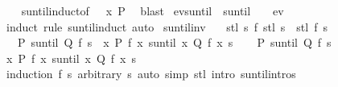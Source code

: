 \begin{isabellebody}
%
\isadelimproof
\ \ %
\endisadelimproof
%
\isatagproof
{}\isamarkupfalse%
\ suntil{\isachardot}induct{\isacharbrackleft}of\ {\isasymphi}\ {\isasympsi}\ x\ P{\isacharbrackright}\ \isamarkupfalse%
\ blast%
\endisatagproof
{\isafoldproof}%
%
\isadelimproof
\isanewline
%
\endisadelimproof
\isanewline
{}\isamarkupfalse%
\ ev{\isacharunderscore}suntil{\isacharcolon}\ {\isachardoublequoteopen}{\isacharparenleft}{\isasymphi}\ suntil\ {\isasympsi}{\isacharparenright}\ {\isasymomega}\ {\isasymLongrightarrow}\ ev\ {\isasympsi}\ {\isasymomega}{\isachardoublequoteclose}\isanewline
%
\isadelimproof
\ \ %
\endisadelimproof
%
\isatagproof
{}\isamarkupfalse%
\ {\isacharparenleft}induct\ rule{\isacharcolon}\ suntil{\isachardot}induct{\isacharparenright}\ auto%
\endisatagproof
{\isafoldproof}%
%
\isadelimproof
\isanewline
%
\endisadelimproof
\isanewline
{}\isamarkupfalse%
\ suntil{\isacharunderscore}inv{\isacharcolon}\isanewline
\ \ \ stl{\isacharcolon}\ {\isachardoublequoteopen}{\isasymAnd}s{\isachardot}\ f\ {\isacharparenleft}stl\ s{\isacharparenright}\ {\isacharequal}\ stl\ {\isacharparenleft}f\ s{\isacharparenright}{\isachardoublequoteclose}\isanewline
\ \ \ {\isachardoublequoteopen}{\isacharparenleft}P\ suntil\ Q{\isacharparenright}\ {\isacharparenleft}f\ s{\isacharparenright}\ {\isasymlongleftrightarrow}\ {\isacharparenleft}{\isacharparenleft}{\isasymlambda}x{\isachardot}\ P\ {\isacharparenleft}f\ x{\isacharparenright}{\isacharparenright}\ suntil\ {\isacharparenleft}{\isasymlambda}x{\isachardot}\ Q\ {\isacharparenleft}f\ x{\isacharparenright}{\isacharparenright}{\isacharparenright}\ s{\isachardoublequoteclose}\isanewline
%
\isadelimproof
%
\endisadelimproof
%
\isatagproof
{}\isamarkupfalse%
\isanewline
\ \ \isamarkupfalse%
\ {\isachardoublequoteopen}{\isacharparenleft}P\ suntil\ Q{\isacharparenright}\ {\isacharparenleft}f\ s{\isacharparenright}{\isachardoublequoteclose}\ \isamarkupfalse%
\ \isamarkupfalse%
\ {\isachardoublequoteopen}{\isacharparenleft}{\isacharparenleft}{\isasymlambda}x{\isachardot}\ P\ {\isacharparenleft}f\ x{\isacharparenright}{\isacharparenright}\ suntil\ {\isacharparenleft}{\isasymlambda}x{\isachardot}\ Q\ {\isacharparenleft}f\ x{\isacharparenright}{\isacharparenright}{\isacharparenright}\ s{\isachardoublequoteclose}\isanewline
\ \ \ \ \isamarkupfalse%
\ {\isacharparenleft}induction\ {\isachardoublequoteopen}f\ s{\isachardoublequoteclose}\ arbitrary{\isacharcolon}\ s{\isacharparenright}\ {\isacharparenleft}auto\ simp{\isacharcolon}\ stl\ intro{\isacharcolon}\ suntil{\isachardot}intros{\isacharparenright}\isanewline

\end{isabellebody}

